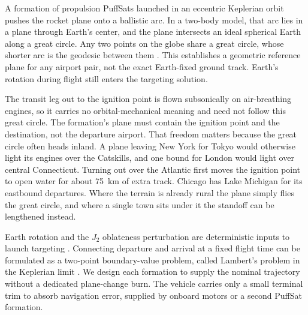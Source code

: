 \documentclass{article}
\begin{document}
A formation of propulsion PuffSats launched in an eccentric Keplerian orbit pushes the rocket plane onto a ballistic arc. In a two-body model, that arc lies in a plane through Earth's center, and the plane intersects an ideal spherical Earth along a great circle. Any two points on the globe share a great circle, whose shorter arc is the geodesic between them \cite{docarmo_diffgeo,bowditch_navigator}. This establishes a geometric reference plane for any airport pair, not the exact Earth-fixed ground track. Earth's rotation during flight still enters the targeting solution.

The transit leg out to the ignition point is flown subsonically on air-breathing engines, so it carries no orbital-mechanical meaning and need not follow this great circle. The formation's plane must contain the ignition point and the destination, not the departure airport. That freedom matters because the great circle often heads inland. A plane leaving New York for Tokyo would otherwise light its engines over the Catskills, and one bound for London would light over central Connecticut. Turning out over the Atlantic first moves the ignition point to open water for about \SI{75}{\kilo\meter} of extra track. Chicago has Lake Michigan for its eastbound departures. Where the terrain is already rural the plane simply flies the great circle, and where a single town sits under it the standoff can be lengthened instead.

Earth rotation and the $J_2$ oblateness perturbation are deterministic inputs to launch targeting \cite{vallado_astrodynamics}. Connecting departure and arrival at a fixed flight time can be formulated as a two-point boundary-value problem, called Lambert's problem in the Keplerian limit \cite{battin_astrodynamics}. We design each formation to supply the nominal trajectory without a dedicated plane-change burn. The vehicle carries only a small terminal trim to absorb navigation error, supplied by onboard motors or a second PuffSat formation.
\end{document}
